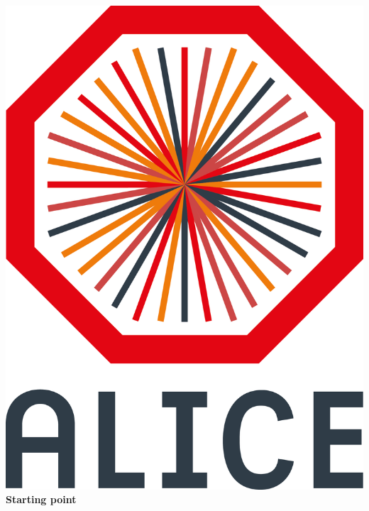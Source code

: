 \documentclass[aspectratio=169,14pt,dvipsnames]{beamer}
\begin{document}
\begin{frame}{\includegraphics[height=0.07\textheight]{2012-Jul-04-4_Color_Logo_CB.png} \hspace{0.2cm}\textbf{Starting point}}
  \begin{figure}
    \centering

\end{figure}
\end{frame}
\end{document}

